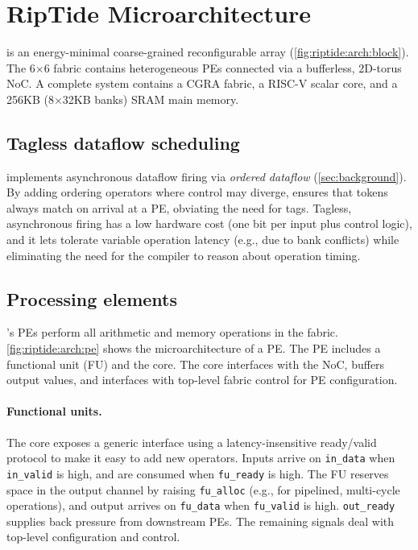 \section{RipTide Microarchitecture}
\label{sec:arch}

\riptide is an energy-minimal coarse-grained reconfigurable array (\autoref{fig:riptide:arch:block}).
% 
The 6$\times$6 fabric contains
heterogeneous PEs connected via a bufferless, 2D-torus NoC.
% 
A complete \riptide system contains a CGRA fabric, a RISC-V scalar core, and a 256KB
(8$\times$32KB banks) SRAM main memory.

\subsection{Tagless dataflow scheduling}

\riptide implements asynchronous dataflow firing via \emph{ordered dataflow} (\autoref{sec:background}).
%
By adding ordering operators where control may diverge,
%
\riptide ensures that tokens always match on arrival at a PE, obviating the need for tags.
%
Tagless, asynchronous firing has a low hardware cost (one bit per input plus
control logic),
%
and it lets \riptide tolerate variable operation latency
(e.g., due to bank conflicts) while eliminating the need for the compiler to reason about
operation timing.

\subsection{Processing elements}
\riptide's PEs perform all arithmetic and memory operations in the fabric.
%
\autoref{fig:riptide:arch:pe} shows the microarchitecture of a PE.
% 
The PE includes a functional unit (FU) and the \textmu core.
% 
The \textmu core interfaces with the NoC, buffers
output values, and interfaces with top-level fabric control for PE configuration.

\paragraph{Functional units.}
The \textmu core exposes a generic interface using a
latency-insensitive ready/valid protocol to make it easy to add new
operators.
%
Inputs arrive on {\tt in\_data} when {\tt in\_valid} is high,
and are consumed when {\tt fu\_ready} is high.
%
The FU reserves space in the output channel by raising {\tt fu\_alloc}
(e.g., for pipelined, multi-cycle operations),
and output arrives on {\tt fu\_data} when {\tt fu\_valid} is high.
%
{\tt out\_ready} supplies back pressure from downstream PEs.
%
The remaining signals deal with top-level configuration and control.

